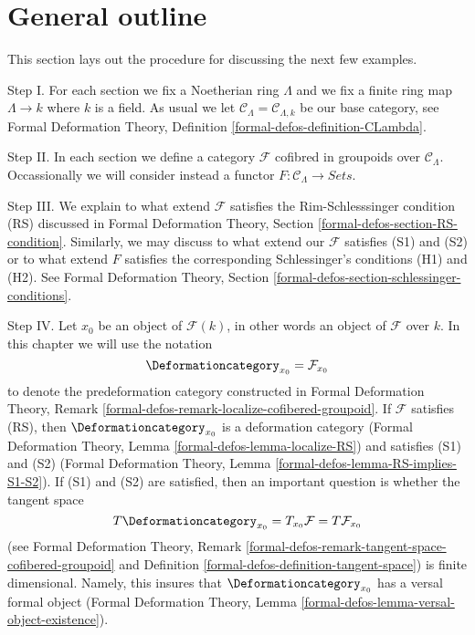 \section{General outline}
\label{section-general}

\noindent
This section lays out the procedure for discussing the next few examples.

\medskip\noindent
Step I. For each section we fix a Noetherian ring $\Lambda$ and
we fix a finite ring map $\Lambda \to k$ where $k$ is a field.
As usual we let $\mathcal{C}_\Lambda = \mathcal{C}_{\Lambda, k}$
be our base category, see
Formal Deformation Theory,
Definition \ref{formal-defos-definition-CLambda}.

\medskip\noindent
Step II. In each section we define a category $\mathcal{F}$
cofibred in groupoids over $\mathcal{C}_\Lambda$. Occassionally
we will consider instead a functor
$F : \mathcal{C}_\Lambda \to \textit{Sets}$.

\medskip\noindent
Step III. We explain to what extend $\mathcal{F}$ satisfies
the Rim-Schlesssinger condition (RS) discussed in
Formal Deformation Theory, Section \ref{formal-defos-section-RS-condition}.
Similarly, we may discuss to what extend our $\mathcal{F}$
satisfies (S1) and (S2) or to what extend $F$ satisfies
the corresponding Schlessinger's conditions (H1) and (H2).
See Formal Deformation Theory, Section
\ref{formal-defos-section-schlessinger-conditions}.

\medskip\noindent
Step IV. Let $x_0$ be an object of $\mathcal{F}(k)$, in other words an object
of $\mathcal{F}$ over $k$. In this chapter we will use the notation
$$
\Deformationcategory_{x_0} = \mathcal{F}_{x_0}
$$
to denote the predeformation category constructed in
Formal Deformation Theory, Remark
\ref{formal-defos-remark-localize-cofibered-groupoid}.
If $\mathcal{F}$ satisfies (RS), then
$\Deformationcategory_{x_0}$ is a deformation category
(Formal Deformation Theory, Lemma
\ref{formal-defos-lemma-localize-RS})
and satisfies (S1) and (S2)
(Formal Deformation Theory, Lemma
\ref{formal-defos-lemma-RS-implies-S1-S2}).
If (S1) and (S2) are satisfied, then
an important question is whether the tangent space
$$
T\Deformationcategory_{x_0} = T_{x_0}\mathcal{F} = T\mathcal{F}_{x_0}
$$
(see Formal Deformation Theory, Remark
\ref{formal-defos-remark-tangent-space-cofibered-groupoid} and
Definition \ref{formal-defos-definition-tangent-space})
is finite dimensional. Namely, this insures that
$\Deformationcategory_{x_0}$ has a versal formal object
(Formal Deformation Theory, Lemma
\ref{formal-defos-lemma-versal-object-existence}).

